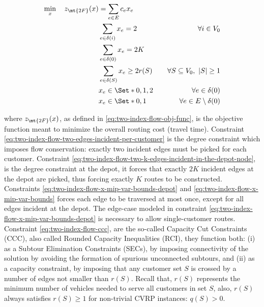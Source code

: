 \begin{align}
	\min_{x} \quad z_\mt{2F}(x) & = \sum_{e \in E} c_e x_e \label{eq:two-index-flow-obj-func}                                                                                        \\
	                            & \sum_{e \in \delta(i)} x_e = 2                              & \quad \forall i \in V_0 \label{eq:two-index-flow-two-edges-incident-per-customer}    \\
	                            & \sum_{e \in \delta(0)} x_e = 2 K                            & \label{eq:two-index-flow-two-k-edges-incident-in-the-depot-node}                     \\
	                            & \sum_{e \in \delta(S)} x_e \ge 2 r(S)                       & \quad \forall S \subseteq V_0,\ |S| \ge 1 \label{eq:two-index-flow-ccc}              \\
	                            & x_e                   \in \Set*{0, 1, 2}                    & \quad \forall e \in \delta(0) \label{eq:two-index-flow-x-mip-var-bounds-depot}       \\
	                            & x_e                   \in \Set*{0, 1}                       & \quad \forall e \in E \setminus \delta(0) \label{eq:two-index-flow-x-mip-var-bounds}
\end{align}

where $z_\mt{2F}(x)$, as defined in \eqref{eq:two-index-flow-obj-func}, is the objective function meant to minimize the overall routing cost (travel time).
Constraint \eqref{eq:two-index-flow-two-edges-incident-per-customer} is the degree constraint which imposes flow conservation: exactly two incident edges must be picked for each customer.
Constraint \eqref{eq:two-index-flow-two-k-edges-incident-in-the-depot-node}, is the degree constraint at the depot, it forces that exactly $2K$ incident edges at the depot are picked, thus forcing exactly $K$ routes to be constructed.
Constraints \eqref{eq:two-index-flow-x-mip-var-bounds-depot} and \eqref{eq:two-index-flow-x-mip-var-bounds} forces each edge to be traversed at most once,
except for all edges incident at the depot.
The edge-case modeled in constraint \eqref{eq:two-index-flow-x-mip-var-bounds-depot} is necessary to allow single-customer routes.
Constraint \eqref{eq:two-index-flow-ccc}, are the so-called Capacity Cut Constraints (CCC), also called Rounded Capacity Inequalities (RCI), they function both:
(i) as a Subtour Elimination Constraints (SECs), by imposing connectivity of the solution by avoiding the formation of spurious unconnected subtours,
and (ii) as a capacity constraint, by imposing that any customer set $S$ is crossed by a number of edges not smaller than $r(S)$.
Recall that, $r(S)$ represents the minimum number of vehicles needed to serve all customers in set $S$,
also, $r(S)$ always satisfies $r(S) \ge 1$ for non-trivial CVRP instances: $q(S) > 0$.

